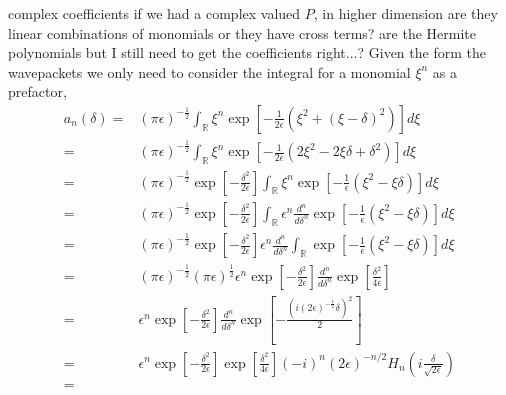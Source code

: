 \documentclass[12pt]{article}
\numberwithin{equation}{section}
\begin{document}
\begin{appendices}
{complex coefficients if we had a complex valued $P$, in higher 
dimension are they linear combinations of monomials or they have 
cross terms?}
are the Hermite polynomials but I still need to get the 
coefficients right...?
Given the form the wavepackets we only need to consider the integral 
for a monomial $\xi^n$ as a prefactor,
\begin{equation}
    \begin{split}
      a_n(\delta) =& (\pi\epsilon)^{-\frac{1}{2}} 
      \int_{\mathbb{R}}
      \xi^n
      \exp{\left[ -\frac{1}{2\epsilon}
      \left(\xi^2 + (\xi - \delta)^2 \right) \right]}
          d\xi
    \\
      =&
      (\pi\epsilon)^{-\frac{1}{2}} 
      \int_{\mathbb{R}}
      \xi^n
      \exp{\left[ -\frac{1}{2\epsilon}
      \left( 2\xi^2 - 2\xi\delta  + \delta^2 \right) \right]}
          d\xi
    \\
      =&
      (\pi\epsilon)^{-\frac{1}{2}} 
      \exp{\left[-\frac{\delta^2}{2\epsilon}\right]}
      \int_{\mathbb{R}}
      \xi^n
      \exp{\left[ -\frac{1}{\epsilon}
      \left( \xi^2 - \xi \delta  \right) \right]}
          d\xi
    \\
      =&
      (\pi\epsilon)^{-\frac{1}{2}} 
      \exp{\left[-\frac{\delta^2}{2\epsilon}\right]}
      \int_{\mathbb{R}}
      \epsilon^n\frac{d^n}{d\delta^n}
      \exp{\left[ -\frac{1}{\epsilon}
      \left( \xi^2 - \xi \delta  \right) \right]}
          d\xi
    \\
      =&
      (\pi\epsilon)^{-\frac{1}{2}} 
      \exp{\left[-\frac{\delta^2}{2\epsilon}\right]}
      \epsilon^n\frac{d^n}{d\delta^n}
      \int_{\mathbb{R}}
      \exp{\left[ -\frac{1}{\epsilon}
      \left( \xi^2 - \xi \delta  \right) \right]}
          d\xi
    \\
      =&
      (\pi\epsilon)^{-\frac{1}{2}} (\pi \epsilon)^{\frac{1}{2}} 
      \epsilon^n
      \exp{\left[-\frac{\delta^2}{2\epsilon}\right]}
    \frac{d^n}{d\delta^n}
    \exp{\left[ \frac{\delta^2}{4\epsilon}  \right]}
    \\
      =&
      \epsilon^n
      \exp{\left[-\frac{\delta^2}{2\epsilon}\right]}
    \frac{d^n}{d\delta^n}
    \exp{\left[-\frac{(i (2\epsilon)^{-\frac{1}{2}}\delta)^2}{2}\right]}
    \\
      =&
      \epsilon^n
      \exp{\left[-\frac{\delta^2}{2\epsilon}\right]}
      \exp{\left[\frac{\delta^2}{4\epsilon}\right]}
      (-i)^n(2\epsilon)^{-n/2}H_n\left(i \frac{\delta}{\sqrt{2\epsilon}}\right) 
    \\
      =&

\end{split}
\end{equation}
\end{appendices}
\end{document}
